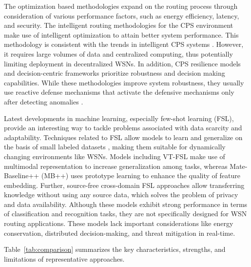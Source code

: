 \documentclass[pdflatex,sn-mathphys-num]{sn-jnl}
\begin{document}
The optimization based methodologies expand on the routing process through consideration of various performance factors, such as energy efficiency, latency, and security. The intelligent routing methodologies for the CPS environment \cite{wong2025sustainable} make use of intelligent optimization to attain better system performance. This methodology is consistent with the trends in intelligent CPS systems \cite{lee2015cyber}. However, it requires large volumes of data and centralized computing, thus potentially limiting deployment in decentralized WSNs. In addition, CPS resilience models \cite{mehdiyev2025resilience} and decision-centric frameworks \cite{jithish2021decision} prioritize robustness and decision making capabilities. While these methodologies improve system robustness, they usually use reactive defense mechanisms that activate the defensive mechanisms only after detecting anomalies \cite{humayed2017cyber}.

Latest developments in machine learning, especially few-shot learning (FSL), provide an interesting way to tackle problems associated with data scarcity and adaptability. Techniques related to FSL allow models to learn and generalize on the basis of small labeled datasets \cite{wang2020generalizing}, making them suitable for dynamically changing environments like WSNs. Models including VT-FSL \cite{li2026vtfsl} make use of multimodal representation to increase generalization among tasks, whereas Mate-Baseline++ (MB++) \cite{zhou2026mate} uses prototype learning to enhance the quality of feature embedding. Further, source-free cross-domain FSL approaches \cite{zhang2026cdfsl,zhang2026trap} allow transferring knowledge without using any source data, which solves the problem of privacy and data availability. Although these models exhibit strong performance in terms of classification and recognition tasks, they are not specifically designed for WSN routing applications. These models lack important considerations like energy conservation, distributed decision-making, and threat mitigation in real-time.

Table~\ref{tab:comparison} summarizes the key characteristics, strengths, and limitations of representative approaches.
\end{document}
